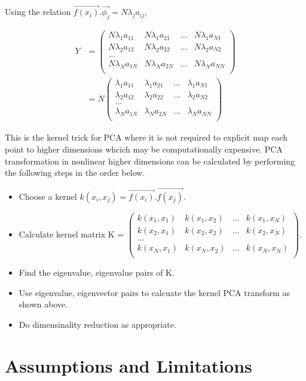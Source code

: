 \documentclass[11pt, a4paper]{article}
\begin{document}
Using the relation $\vec{f(x_i)}.\vec{\phi_j} = N\lambda_j a_{ij}$,

\begin{align*}
    Y &= \begin{pmatrix}
          N\lambda_1 a_{11} & N\lambda_1 a_{21} & ... & N\lambda_1 a_{N1} \\ 
          N\lambda_2 a_{12} & N\lambda_2 a_{22} & ... & N\lambda_2 a_{N2} \\ 
          ... \\
          N\lambda_N a_{1N} & N\lambda_N a_{2N} & ... & N\lambda_N a_{NN} \\ 
\end{pmatrix} \\
    &=  N\begin{pmatrix}
          \lambda_1 a_{11} & \lambda_1 a_{21} & ... & \lambda_1 a_{N1} \\ 
          \lambda_2 a_{12} & \lambda_2 a_{22} & ... & \lambda_2 a_{N2} \\ 
          ... \\
          \lambda_N a_{1N} & \lambda_N a_{2N} & ... & \lambda_N a_{NN} \\ 
\end{pmatrix}      
\end{align*} 

This is the kernel trick for PCA where it is not required to explicit map each point to higher dimensions whcich may be computationally expensive. PCA transformation in nonlinear higher dimensions can be calculated by performing the following steps in the order below. 

\begin{itemize}
    \item Choose a kernel $ k(x_i, x_j) = \vec{f(x_i)}.\vec{f(x_j)}$.
    \item Calculate kernel matrix K = $\begin{pmatrix}
        k(x_1, x_1) & k(x_1, x_2) & ... & k(x_1, x_N) \\
        k(x_2, x_1) & k(x_2, x_2) & ... & k(x_2, x_N) \\
        ... \\
        k(x_N, x_1) & k(x_N, x_2) & ... & k(x_N, x_N) \\
    \end{pmatrix}$.
    \item Find the eigenvalue, eigenvalue pairs of K.
    \item Use eigenvalue, eigenvector pairs to calcuate the kernel PCA transform as shown above.
    \item Do dimensinality reduction as appropriate.  
\end{itemize}

\section{Assumptions and Limitations}
\end{document}
